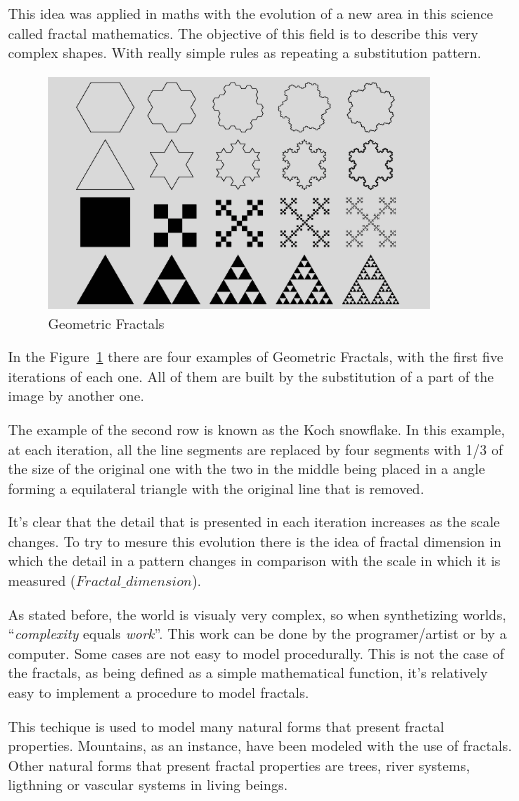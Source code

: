 This idea was applied in maths with the evolution of a new area in this science called fractal mathematics. The objective of this field is to describe this very complex shapes. With really simple rules as repeating a substitution pattern. 

\begin{figure}[htbp]
	\centering
	\includegraphics[width=0.9\textwidth]{img/Theory/Fractals/Fractal1_1000.png}
	\caption{Geometric Fractals}
	\label{fig:GFractals}
\end{figure}

In the Figure~\ref{fig:GFractals} there are four examples of Geometric Fractals, with the first five iterations of each one. All of them are built by the substitution of a part of the image by another one. 

The example of the second row is known as the Koch snowflake. In this example, at each iteration, all the line segments are replaced by four segments with 1/3 of the size of the original one with the two in the middle being placed in a angle forming a equilateral triangle with the original line that is removed.

It's clear that the detail that is presented in each iteration increases as the scale changes. To try to mesure this evolution there is the idea of ​​fractal dimension in which the detail in a pattern changes in comparison with the scale in which it is measured ($Fractal\_dimension$).

As stated before, the world is visualy very complex, so when synthetizing worlds, ``\emph{complexity} equals \emph{work}''\cite{Ebert2002}. This work can be done by the programer/artist or by a computer. Some cases are not easy to model procedurally. This is not the case of the fractals, as being defined as a simple mathematical function, it's relatively easy to implement a procedure to model fractals. 

This techique is used to model many natural forms that present fractal properties. Mountains, as an instance, have been modeled with the use of fractals. Other natural forms that present fractal properties are trees, river systems, ligthning or vascular systems in living beings.




